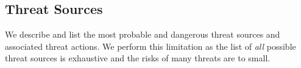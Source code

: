 \documentclass{article}
\begin{document}

	
	
	



\subsection{Threat Sources}

We describe and list the most probable and dangerous threat sources and associated threat actions. 
We perform this limitation as the list of \emph{all} possible threat sources is exhaustive and the risks of many threats are to small. 
\end{document}
